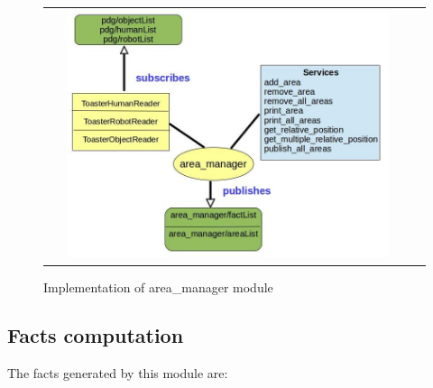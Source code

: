 \documentclass[a4paper]{article}
\begin{document}
 \begin{figure}[ht!]
 \centering
 \begin{tabular}{cc}
  \includegraphics[width=0.90\textwidth]{img/areaManager.jpg}
 \end{tabular}
 \caption{Implementation of area\_manager module}
 \label{fig:areaManager}
 \end{figure}



\subsection{Facts computation}

The facts generated by this module are:
\end{document}
